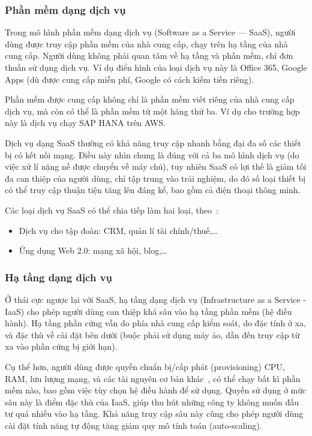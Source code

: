 \documentclass{article}
\begin{document}
\subsubsection{Phần mềm dạng dịch vụ}

Trong mô hình phần mềm dạng dịch vụ (Software as a Service --- SaaS), người dùng
được truy cập phần mềm của nhà cung cấp, chạy trên hạ tầng của nhà cung cấp.
Người dùng không phải quan tâm về hạ tầng và phần mềm, chỉ đơn thuần sử dụng
dịch vụ. Ví dụ điển hình của loại dịch vụ này là Office 365, Google Apps (dù
được cung cấp miễn phí, Google có cách kiếm tiền riêng).

Phần mềm được cung cấp không chỉ là phần mềm viết riêng của nhà cung cấp dịch
vụ, mà còn có thể là phần mềm từ một hãng thứ ba. Ví dụ cho trường hợp này là
dịch vụ chạy SAP HANA trên AWS\@.

Dịch vụ dạng SaaS thường có khả năng truy cập nhanh bằng đại đa số các thiết bị
có kết nối mạng. Điều này nhìn chung là đúng với cả ba mô hình dịch vụ (do việc
xử lí nặng nề được chuyển về máy chủ), tuy nhiên SaaS có lợi thế là giảm tối đa
can thiệp của người dùng, chỉ tập trung vào trải nghiệm, do đó số loại thiết bị
có thể truy cập thuận tiện tăng lên đáng kể, bao gồm cả điện thoại thông minh.

Các loại dịch vụ SaaS có thể chia tiếp làm hai loại,
theo~\cite{MARINESCU201813}:

\begin{itemize}
    \item Dịch vụ cho tập đoàn: CRM, quản lí tài chính/thuế,\ldots
    \item Ứng dụng Web 2.0: mạng xã hội, blog,\ldots
\end{itemize}

\subsubsection{Hạ tầng dạng dịch vụ}

Ở thái cực ngược lại với SaaS, hạ tầng dạng dịch vụ (Infrastructure as a Service
- IaaS) cho phép người dùng can thiệp khá sâu vào hạ tầng phần mềm (hệ điều
hành). Hạ tầng phần cứng vẫn do phía nhà cung cấp kiểm soát, do đặc tính ở xa,
và đặc thù về cài đặt bên dưới (buộc phải sử dụng máy ảo, dẫn đến truy cập từ xa
vào phần cứng bị giới hạn).

Cụ thể hơn, người dùng được quyền chuẩn bị/cấp phát (provisioning) CPU, RAM, lưu
lượng mạng, và các tài nguyên cơ bản khác~\cite{MARINESCU201813}, có thể chạy
bất kì phần mềm nào, bao gồm việc tùy chọn hệ điều hành để sử dụng. Quyền sử
dụng ở mức sâu này là điểm đặc thù của IaaS, giúp thu hút những công ty không
muốn đầu tư quá nhiều vào hạ tầng. Khả năng truy cập sâu này cũng cho phép người
dùng cài đặt tính năng tự động tăng giảm quy mô tính toán (auto-scaling).
\end{document}
